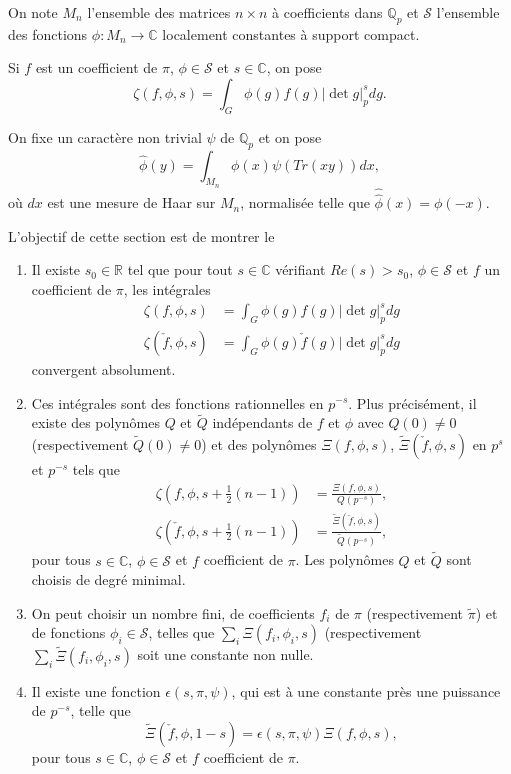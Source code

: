 On note $M_n$ l'ensemble des matrices $n \times n$ à coefficients dans $\mathbb{Q}_p$ et $\mathcal{S}$ l'ensemble des fonctions $\phi : M_n \rightarrow \mathbb{C}$ localement constantes à support compact.

Si $f$ est un coefficient de $\pi$, $\phi \in \mathcal{S}$ et $s \in \mathbb{C}$, on pose
\begin{equation}
\zeta(f, \phi, s) = \int_G \phi(g)f(g)|\det g|_p^s dg.
\end{equation}

On fixe un caractère non trivial $\psi$ de $\mathbb{Q}_p$ et on pose
\begin{equation}
\hat{\phi}(y) = \int_{M_n} \phi(x) \psi(Tr(xy)) dx,
\end{equation}
où $dx$ est une mesure de Haar sur $M_n$, normalisée telle que $\hat{\hat{\phi}}(x)=\phi(-x)$.

L'objectif de cette section est de montrer le
\begin{theoreme}
\label{thm_padique}
\begin{enumerate}
\item Il existe $s_0 \in \mathbb{R}$ tel que pour tout $s \in \mathbb{C}$ vérifiant $Re (s) > s_0$, $\phi \in \mathcal{S}$ et $f$ un coefficient de $\pi$, les intégrales
\begin{align}
\zeta(f, \phi, s) &= \int_G \phi(g)f(g)|\det g|_p^s dg \\
\zeta(\check{f}, \phi, s) &= \int_G \phi(g)\check{f}(g)|\det g|_p^s dg
\end{align}
convergent absolument.
\item Ces intégrales sont des fonctions rationnelles en $p^{-s}$. Plus précisément, il existe des polynômes $Q$ et $\tilde{Q}$ indépendants de $f$ et $\phi$ avec $Q(0)\neq 0$ (respectivement $\tilde{Q}(0)\neq 0$) et des polynômes $\Xi(f, \phi, s)$, $\tilde{\Xi}(\check{f}, \phi, s)$ en $p^{s}$ et $p^{-s}$ tels que
\begin{align}
\zeta(f, \phi, s+\frac{1}{2}(n-1)) &= \frac{\Xi(f, \phi, s)}{Q(p^{-s})}, \\
\zeta(\check{f}, \phi, s+\frac{1}{2}(n-1)) &= \frac{\tilde{\Xi}(\check{f}, \phi, s)}{\tilde{Q}(p^{-s})},
\end{align}
pour tous $s \in \mathbb{C}$, $\phi \in \mathcal{S}$ et $f$ coefficient de $\pi$. Les polynômes $Q$ et $\tilde{Q}$ sont choisis de degré minimal.
\item On peut choisir un nombre fini, de coefficients $f_i$ de $\pi$ (respectivement $\tilde{\pi}$) et de fonctions $\phi_i \in \mathcal{S}$, telles que $\sum_i \Xi(f_i, \phi_i, s)$ (respectivement $\sum_i \tilde{\Xi}(f_i, \phi_i, s)$ soit une constante non nulle.
\item Il existe une fonction $\epsilon(s, \pi, \psi)$, qui est à une constante près une puissance de $p^{-s}$, telle que
\begin{equation}
\label{epsilon}
\tilde{\Xi}(\check{f}, \hat{\phi}, 1-s) = \epsilon(s, \pi, \psi)\Xi(f, \phi, s),
\end{equation}
pour tous $s\in \mathbb{C}$, $\phi \in \mathcal{S}$ et $f$ coefficient de $\pi$.
\end{enumerate}
\end{theoreme}

